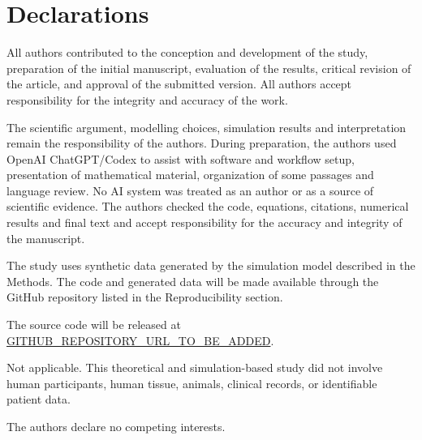 \documentclass[pdflatex,sn-nature]{sn-jnl}
\begin{document}
\backmatter

\section*{Declarations}

All authors contributed to the conception and development of the study, preparation
of the initial manuscript, evaluation of the results, critical revision of the
article, and approval of the submitted version. All authors accept responsibility
for the integrity and accuracy of the work.

The scientific argument, modelling choices, simulation results and interpretation
remain the responsibility of the authors. During preparation, the authors used OpenAI
ChatGPT/Codex to assist with software and workflow setup, presentation of mathematical
material, organization of some passages and language review. No AI system was treated
as an author or as a source of scientific evidence. The authors checked the code,
equations, citations, numerical results and final text and accept responsibility for
the accuracy and integrity of the manuscript.

The study uses synthetic data generated by the simulation model described in the
Methods. The code and generated data will be made available through the GitHub
repository listed in the Reproducibility section.

The source code will be released at
\url{GITHUB_REPOSITORY_URL_TO_BE_ADDED}.

Not applicable. This theoretical and simulation-based study did not involve human
participants, human tissue, animals, clinical records, or identifiable patient data.

The authors declare no competing interests.


\end{document}
